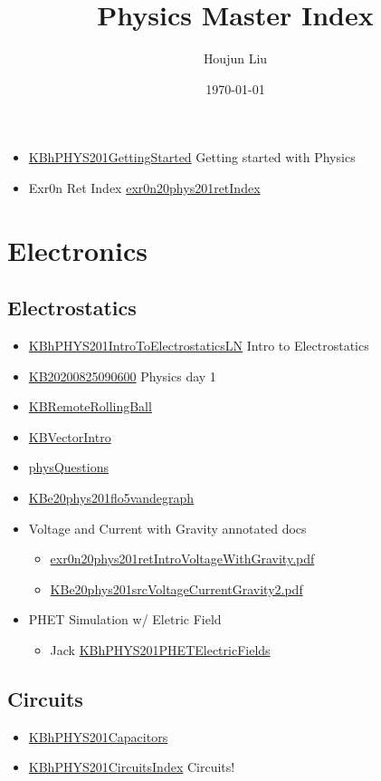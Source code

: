 \documentclass[letterpaper]{article}
\author{Houjun Liu}
\date{\today}
\title{Physics Master Index}
\renewcommand{\tableofcontents}{}
\begin{document}
\tableofcontents

\begin{itemize}
\item \href{KBhPHYS201GettingStarted.org}{KBhPHYS201GettingStarted}
Getting started with Physics
\item Exr0n Ret Index
\href{exr0n20phys201retIndex.org}{exr0n20phys201retIndex}
\end{itemize}

\section{Electronics}
\label{sec:org36ba47a}
\subsection{Electrostatics}
\label{sec:orgc76b7c1}
\begin{itemize}
\item \href{KBhPHYS201IntroToElectrostaticsLN.org}{KBhPHYS201IntroToElectrostaticsLN}
Intro to Electrostatics
\item \href{KB20200825090600.org}{KB20200825090600} Physics day 1
\item \href{KBRemoteRollingBall.org}{KBRemoteRollingBall}
\item \href{KBVectorIntro.org}{KBVectorIntro}
\item \href{physQuestions.org}{physQuestions}
\item \href{KBe20phys201flo5vandegraph.org}{KBe20phys201flo5vandegraph}
\item Voltage and Current with Gravity annotated docs

\begin{itemize}
\item \href{exr0n20phys201retIntroVoltageWithGravity.pdf.org}{exr0n20phys201retIntroVoltageWithGravity.pdf}
\item \href{KBe20phys201srcVoltageCurrentGravity2.pdf.org}{KBe20phys201srcVoltageCurrentGravity2.pdf}
\end{itemize}

\item PHET Simulation w/ Eletric Field

\begin{itemize}
\item Jack
\href{KBhPHYS201PHETElectricFields.org}{KBhPHYS201PHETElectricFields}
\end{itemize}
\end{itemize}

\subsection{Circuits}
\label{sec:org06173ef}
\begin{itemize}
\item \href{KBhPHYS201Capacitors.org}{KBhPHYS201Capacitors}
\item \href{KBhPHYS201CircuitsIndex.org}{KBhPHYS201CircuitsIndex}
Circuits!
\end{itemize}
\end{document}
